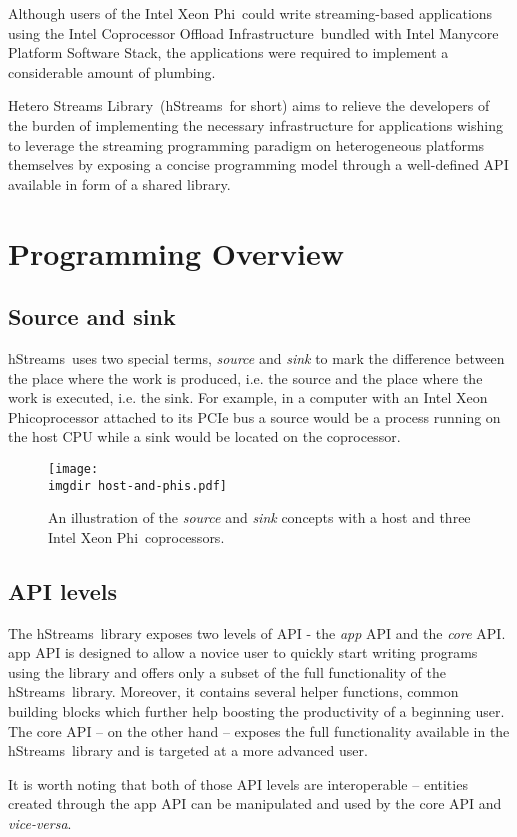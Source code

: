 \documentclass[a4,oneside]{book}
\newcommand{\ixp}{Intel\textregistered{} Xeon Phi\texttrademark{}}
\newcommand{\coi}{Intel\textregistered{} Coprocessor Offload Infrastructure}
\newcommand{\mpssFullName}{Intel\textregistered{} Manycore Platform Software Stack}
\newcommand{\hstreams}{hStreams}
\newcommand{\heterostreams}{Hetero Streams Library}
\newcommand{\imgdir}{../../../doc/images/}
\begin{document}
Although users of the \ixp\ could write streaming-based applications using the \coi\ bundled with \mpssFullName, the applications were required to implement a considerable amount of plumbing.

\heterostreams\ (\hstreams\ for short) aims to relieve the developers of the burden of implementing the necessary infrastructure for applications wishing to leverage the streaming programming paradigm on heterogeneous platforms themselves by exposing a concise programming model through a well-defined API available in form of a shared library.

\chapter{Programming Overview}
\section{Source and sink}
\hstreams\ uses two special terms, \emph{source} and \emph{sink} to mark the difference between the place where the work is produced, i.e. the source and the place where the work is executed, i.e. the sink.
For example, in a computer with an \ixp coprocessor attached to its PCIe bus a source would be a process running on the host CPU while a sink would be located on the coprocessor. 
\begin{figure}[h]
    \centering
    \texttt{[image: \\imgdir host-and-phis.pdf]}
    \caption{An illustration of the \emph{source} and \emph{sink} concepts with a host and three \ixp\ coprocessors.}
    \label{fig:host-and-phis}
\end{figure}

\section{API levels}
The \hstreams\ library exposes two levels of API - the \emph{app} API and the \emph{core} API.
app API is designed to allow a novice user to quickly start writing programs using the library and offers only a subset of the full functionality of the \hstreams\ library.
Moreover, it contains several helper functions, common building blocks which further help boosting the productivity of a beginning user.
The core API -- on the other hand -- exposes the full functionality available in the \hstreams\ library and is targeted at a more advanced user.

It is worth noting that both of those API levels are interoperable -- entities created through the app API can be manipulated and used by the core API and \emph{vice-versa}.
\end{document}
